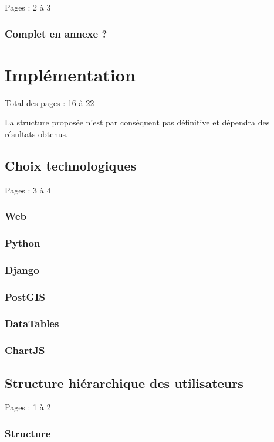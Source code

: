 \documentclass{eplmastersthesis_FR}
\begin{document}
			Pages : 2 à 3

			\subsection*{Complet en annexe ?}

	\chapter{Implémentation}

		Total des pages : 16 à 22

		La structure proposée n'est par conséquent pas définitive et dépendra des résultats obtenus.

		\section{Choix technologiques}

			Pages : 3 à 4

			\subsection*{Web}
			\subsection*{Python}
			\subsection*{Django}
			\subsection*{PostGIS}
			\subsection*{DataTables}
			\subsection*{ChartJS}

		\section{Structure hiérarchique des utilisateurs}

			Pages : 1 à 2

			\subsection*{Structure}
\end{document}
